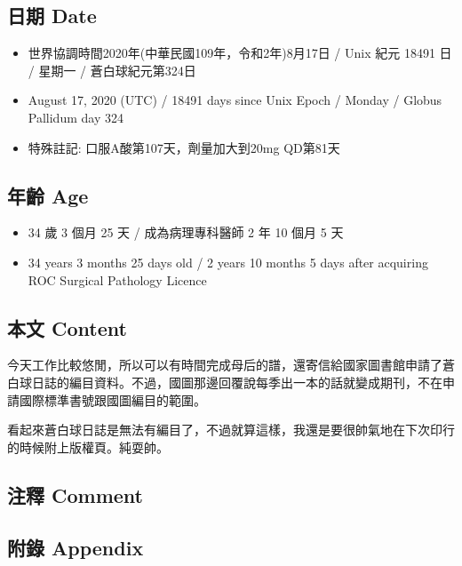 \documentclass[a5paper, 11pt
]{book}
\providecommand{\tightlist}{%
  \setlength{\itemsep}{0pt}\setlength{\parskip}{0pt}}
\begin{document}
\hypertarget{ux65e5ux671f-date-77}{%
\subsection{日期 Date}\label{ux65e5ux671f-date-77}}

\begin{itemize}
\tightlist
\item
  世界協調時間2020年(中華民國109年，令和2年)8月17日 / Unix 紀元 18491 日
  / 星期一 / 蒼白球紀元第324日
\item
  August 17, 2020 (UTC) / 18491 days since Unix Epoch / Monday / Globus
  Pallidum day 324
\item
  特殊註記: 口服A酸第107天，劑量加大到20mg QD第81天
\end{itemize}

\hypertarget{ux5e74ux9f61-age-77}{%
\subsection{年齡 Age}\label{ux5e74ux9f61-age-77}}

\begin{itemize}
\tightlist
\item
  34 歲 3 個月 25 天 / 成為病理專科醫師 2 年 10 個月 5 天
\item
  34 years 3 months 25 days old / 2 years 10 months 5 days after
  acquiring ROC Surgical Pathology Licence
\end{itemize}

\hypertarget{ux672cux6587-content-77}{%
\subsection{本文 Content}\label{ux672cux6587-content-77}}

今天工作比較悠閒，所以可以有時間完成母后的譜，還寄信給國家圖書館申請了蒼白球日誌的編目資料。不過，國圖那邊回覆說每季出一本的話就變成期刊，不在申請國際標準書號跟國圖編目的範圍。

看起來蒼白球日誌是無法有編目了，不過就算這樣，我還是要很帥氣地在下次印行的時候附上版權頁。純耍帥。

\hypertarget{ux6ce8ux91cb-comment-77}{%
\subsection{注釋 Comment}\label{ux6ce8ux91cb-comment-77}}

\hypertarget{ux9644ux9304-appendix-77}{%
\subsection{附錄 Appendix}\label{ux9644ux9304-appendix-77}}
\end{document}
